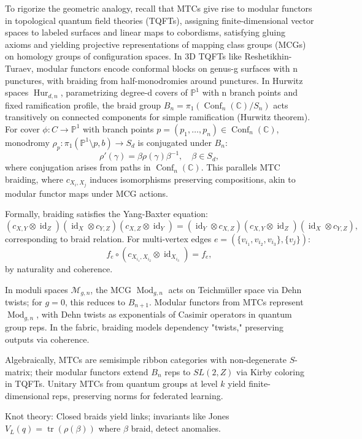 \documentclass{amsart}
\DeclareMathOperator\Hur{Hur}
\DeclareMathOperator\id{id}
\DeclareMathOperator\tr{tr}
\DeclareMathOperator\Conf{Conf}
\DeclareMathOperator\Mod{Mod}
\begin{document}
To rigorize the geometric analogy, recall that MTCs give rise to modular functors in topological quantum field theories (TQFTs), assigning finite-dimensional vector spaces to labeled surfaces and linear maps to cobordisms, satisfying gluing axioms and yielding projective representations of mapping class groups (MCGs) on homology groups of configuration spaces. In 3D TQFTs like Reshetikhin-Turaev, modular functors encode conformal blocks on genus-g surfaces with n punctures, with braiding from half-monodromies around punctures. In Hurwitz spaces \( \Hur_{d,n} \), parametrizing degree-d covers of \( \mathbb{P}^1 \) with n branch points and fixed ramification profile, the braid group \( B_n = \pi_1(\Conf_n(\mathbb{C})/S_n) \) acts transitively on connected components for simple ramification (Hurwitz theorem). For cover \( \phi: C \to \mathbb{P}^1 \) with branch points \( p = (p_1, \dots, p_n) \in \Conf_n(\mathbb{C}) \), monodromy \( \rho_p: \pi_1(\mathbb{P}^1 \setminus p, b) \to S_d \) is conjugated under \( B_n \):
\[
\rho'(\gamma) = \beta \rho(\gamma) \beta^{-1}, \quad \beta \in S_d,
\]
where conjugation arises from paths in \( \Conf_n(\mathbb{C}) \). This parallels MTC braiding, where \( c_{X_i, X_j} \) induces isomorphisms preserving compositions, akin to modular functor maps under MCG actions.

Formally, braiding satisfies the Yang-Baxter equation:
\[
(c_{X,Y} \otimes \id_Z) (\id_X \otimes c_{Y,Z}) (c_{X,Z} \otimes \id_Y) = (\id_Y \otimes c_{X,Z}) (c_{X,Y} \otimes \id_Z) (\id_X \otimes c_{Y,Z}),
\]
corresponding to braid relation. For multi-vertex edges \( e = (\{v_{i_1}, v_{i_2}, v_{i_3}\}, \{v_j\}) \):
\[
f_e \circ (c_{X_{i_1}, X_{i_2}} \otimes \id_{X_{i_3}}) = f_e,
\]
by naturality and coherence.

In moduli spaces \( \mathcal{M}_{g,n} \), the MCG \( \Mod_{g,n} \) acts on Teichmüller space via Dehn twists; for $g=0$, this reduces to $B_{n+1}$. Modular functors from MTCs represent \( \Mod_{g,n} \), with Dehn twists as exponentials of Casimir operators in quantum group reps. In the fabric, braiding models dependency "twists," preserving outputs via coherence.

Algebraically, MTCs are semisimple ribbon categories with non-degenerate $S$-matrix; their modular functors extend $B_n$ reps to $SL(2,Z)$ via Kirby coloring in TQFTs. Unitary MTCs from quantum groups at level $k$ yield finite-dimensional reps, preserving norms for federated learning.

Knot theory: Closed braids yield links; invariants like Jones $V_L(q) = \tr (\rho(\beta))$ where $\beta$ braid, detect anomalies.
\end{document}
